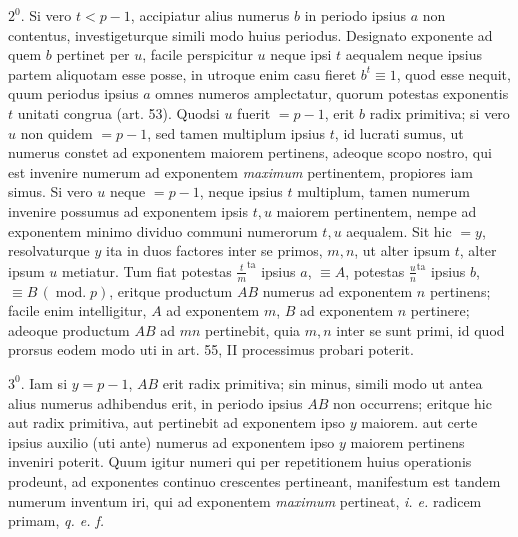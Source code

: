 $2^0$. Si vero $t<p-1$, accipiatur alius numerus $b$ in periodo ipsius $a$ non contentus, investigeturque simili modo huius periodus. Designato exponente ad quem $b$ pertinet per $u$, facile perspicitur $u$ neque ipsi $t$ aequalem neque ipsius partem aliquotam esse posse, in utroque enim casu fieret $b^t\equiv1$, quod esse nequit, quum periodus ipsius $a$ omnes numeros amplectatur, quorum potestas exponentis $t$ unitati congrua (art. 53). Quodsi $u$ fuerit $=p-1$, erit $b$ radix primitiva; si vero $u$ non quidem $=p-1$, sed tamen multiplum ipsius $t$, id lucrati sumus, ut numerus constet ad exponentem maiorem pertinens, adeoque scopo nostro, qui est invenire numerum ad exponentem \emph{maximum} pertinentem, propiores iam simus. Si vero $u$ neque $=p-1$, neque ipsius $t$ multiplum, tamen numerum invenire possumus ad exponentem ipsis $t,u$ maiorem pertinentem, nempe ad exponentem minimo dividuo communi numerorum $t,u$ aequalem. Sit hic $=y$, resolvaturque $y$ ita in duos factores inter se primos, $m,n$, ut alter ipsum $t$, alter ipsum $u$ metiatur. Tum fiat potestas $\frac{t}{m}^{\mathrm{ta}}$ ipsius $a$, $\equiv A$, potestas $\frac{u}{n}^{\mathrm{ta}}$ ipsius $b$, $\equiv B\,(\operatorname{mod.}p)$, eritque productum $AB$ numerus ad exponentem $n$ pertinens; facile enim intelligitur, $A$ ad exponentem $m$, $B$ ad exponentem $n$ pertinere; adeoque productum $AB$ ad $mn$ pertinebit, quia $m,n$ inter se sunt primi, id quod prorsus eodem modo uti in art. 55, II processimus probari poterit.

$3^0$. Iam si $y=p-1$, $AB$ erit radix primitiva; sin minus, simili modo ut antea alius numerus adhibendus erit, in periodo ipsius $AB$ non occurrens; eritque hic aut radix primitiva, aut pertinebit ad exponentem ipso $y$ maiorem. aut certe ipsius auxilio (uti ante) numerus ad exponentem ipso $y$ maiorem pertinens inveniri poterit. Quum igitur numeri qui per repetitionem huius operationis prodeunt, ad exponentes continuo crescentes pertineant, manifestum est tandem numerum inventum iri, qui ad exponentem \emph{maximum} pertineat, \emph{i. e.} radicem primam, \emph{q. e. f.}

